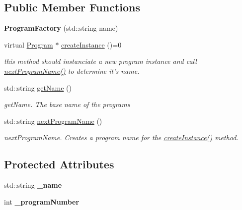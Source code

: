\subsection*{Public Member Functions}
\begin{DoxyCompactItemize}
\item 
\hypertarget{classdrobot_1_1program_1_1ProgramFactory_a983aeedad36248a7f669be06640a9d37}{{\bfseries Program\-Factory} (std\-::string name)}\label{classdrobot_1_1program_1_1ProgramFactory_a983aeedad36248a7f669be06640a9d37}

\item 
virtual \hyperlink{classdrobot_1_1program_1_1Program}{Program} $\ast$ \hyperlink{classdrobot_1_1program_1_1ProgramFactory_ac47a7a6390cfb5488ddc4581c6cb9d6f}{create\-Instance} ()=0
\begin{DoxyCompactList}\small\item\em this method should instanciate a new program instance and call \hyperlink{classdrobot_1_1program_1_1ProgramFactory_afba61329928433e93b8cede0d892a55e}{next\-Program\-Name()} to determine it's name. \end{DoxyCompactList}\item 
std\-::string \hyperlink{classdrobot_1_1program_1_1ProgramFactory_aea9163e3cb4901b1d2b517225c5046f7}{get\-Name} ()
\begin{DoxyCompactList}\small\item\em get\-Name. The base name of the programs \end{DoxyCompactList}\item 
std\-::string \hyperlink{classdrobot_1_1program_1_1ProgramFactory_afba61329928433e93b8cede0d892a55e}{next\-Program\-Name} ()
\begin{DoxyCompactList}\small\item\em next\-Program\-Name. Creates a program name for the \hyperlink{classdrobot_1_1program_1_1ProgramFactory_ac47a7a6390cfb5488ddc4581c6cb9d6f}{create\-Instance()} method. \end{DoxyCompactList}\end{DoxyCompactItemize}
\subsection*{Protected Attributes}
\begin{DoxyCompactItemize}
\item 
\hypertarget{classdrobot_1_1program_1_1ProgramFactory_ab956cb5a3106cc177dadc351c47ec8e2}{std\-::string {\bfseries \-\_\-name}}\label{classdrobot_1_1program_1_1ProgramFactory_ab956cb5a3106cc177dadc351c47ec8e2}

\item 
\hypertarget{classdrobot_1_1program_1_1ProgramFactory_aea32ffbc04581a27a823fe520a12c7ce}{int {\bfseries \-\_\-program\-Number}}\label{classdrobot_1_1program_1_1ProgramFactory_aea32ffbc04581a27a823fe520a12c7ce}

\end{DoxyCompactItemize}


